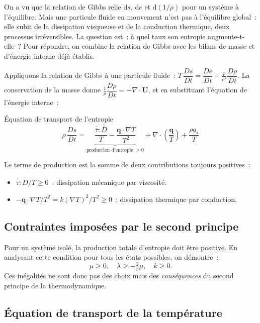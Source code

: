 \documentclass[11pt,a4paper]{report}
\newcommand{\DD}[1]{\dfrac{D #1}{Dt}}
\newcommand{\ten}[1]{\overline{\overline{#1}}}   %
\begin{document}
On a vu que la relation de Gibbs relie $\mathrm{d}s$, $\mathrm{d}e$ et $\mathrm{d}(1/\rho)$ pour un syst\`eme \`a l'\'equilibre. Mais une particule fluide en mouvement n'est pas \`a l'\'equilibre global~: elle subit de la dissipation visqueuse et de la conduction thermique, deux processus irr\'eversibles. La question est~: \`a quel taux son entropie augmente-t-elle~? Pour r\'epondre, on combine la relation de Gibbs avec les bilans de masse et d'\'energie interne d\'ej\`a \'etablis.

Appliquons la relation de Gibbs \`a une particule fluide~:
$T\,\DD{s} = \DD{e} + \frac{p}{\rho^2}\DD{\rho}$.
La conservation de la masse donne $\frac{1}{\rho}\DD{\rho} = -\nabla\cdot\bm{U}$,
et en substituant l'\'equation de l'\'energie interne~:

\begin{importantbox}{\'Equation de transport de l'entropie}
\[
  \rho\,\DD{s}
  = \underbrace{\frac{\ten{\tau}:\ten{D}}{T}
                - \frac{\bm{q}\cdot\nabla T}{T^2}}_{\text{production d'entropie }\geq 0}
    + \nabla\cdot\!\left(\frac{\bm{q}}{T}\right)
    + \frac{\rho q_\star}{T}
\]
\end{importantbox}

Le terme de production est la somme de deux contributions toujours positives~:
\begin{itemize}
  \item $\ten{\tau}:\ten{D}/T \geq 0$~: dissipation m\'ecanique par viscosit\'e.
  \item $-\bm{q}\cdot\nabla T/T^2 = k(\nabla T)^2/T^2 \geq 0$~: dissipation
        thermique par conduction.
\end{itemize}

\subsection{Contraintes impos\'ees par le second principe}

Pour un syst\`eme isol\'e, la production totale d'entropie doit \^etre positive. En
analysant cette condition pour tous les \'etats possibles, on d\'emontre~:
\[
  \mu \geq 0, \quad \lambda \geq -\tfrac{2}{3}\mu, \quad k \geq 0.
\]
Ces in\'egalit\'es ne sont donc pas des choix mais des \emph{cons\'equences} du second
principe de la thermodynamique.

\subsection{\'Equation de transport de la temp\'erature}
\end{document}
